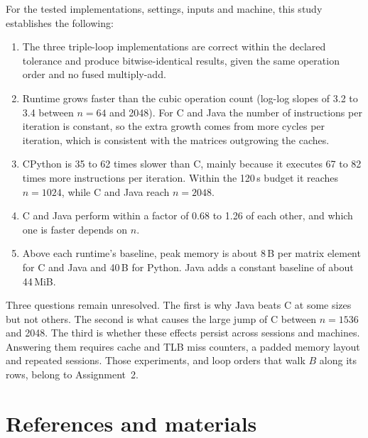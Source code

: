 \documentclass[11pt,a4paper]{article}
\begin{document}
For the tested implementations, settings, inputs and machine, this study
establishes the following:
\begin{enumerate}
  \item The three triple-loop implementations are correct within the declared
  tolerance and produce bitwise-identical results, given the same operation
  order and no fused multiply-add.
  \item Runtime grows faster than the cubic operation count (log-log slopes of
  3.2 to 3.4 between $n=64$ and 2048). For C and Java the number of
  instructions per iteration is constant, so the extra growth comes from more
  cycles per iteration, which is consistent with the matrices outgrowing the
  caches.
  \item CPython is 35 to 62 times slower than C, mainly because it executes
  67 to 82 times more instructions per iteration. Within the 120\,s budget it
  reaches $n=1024$, while C and Java reach $n=2048$.
  \item C and Java perform within a factor of 0.68 to 1.26 of each other, and
  which one is faster depends on $n$.
  \item Above each runtime's baseline, peak memory is about 8\,B per matrix
  element for C and Java and 40\,B for Python. Java adds a constant baseline of
  about 44\,MiB.
\end{enumerate}
Three questions remain unresolved. The first is why Java beats C at some sizes
but not others. The second is what causes the large jump of C between $n=1536$
and 2048. The third is whether these effects persist across sessions and
machines. Answering them requires cache and TLB miss counters, a padded memory
layout and repeated sessions. Those experiments, and loop orders that walk $B$
along its rows, belong to Assignment~2.

\section{References and materials}
\label{sec:materials}
\end{document}
